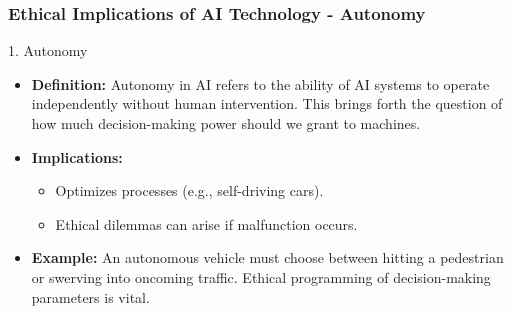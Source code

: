 \documentclass[aspectratio=169]{beamer}
\begin{document}
\begin{frame}[fragile]
    \frametitle{Ethical Implications of AI Technology - Autonomy}
    \begin{block}{1. Autonomy}
        \begin{itemize}
            \item \textbf{Definition:} Autonomy in AI refers to the ability of AI systems to operate independently without human intervention. This brings forth the question of how much decision-making power should we grant to machines.
            \item \textbf{Implications:} 
            \begin{itemize}
                \item Optimizes processes (e.g., self-driving cars).
                \item Ethical dilemmas can arise if malfunction occurs.
            \end{itemize}
            \item \textbf{Example:} An autonomous vehicle must choose between hitting a pedestrian or swerving into oncoming traffic. Ethical programming of decision-making parameters is vital.
        \end{itemize}
    \end{block}
\end{frame}
\end{document}
